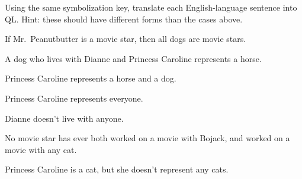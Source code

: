 \problempart
\label{pr.QLbojackother}
Using the same symbolization key, translate each English-language sentence into QL. Hint: these should have different forms than the cases above.
\begin{earg}
\item If Mr.\ Peanutbutter is a movie star, then all dogs are movie stars.
\item A dog who lives with Dianne and Princess Caroline represents a horse.
\item Princess Caroline represents a horse and a dog.
\item Princess Caroline represents everyone.
\item Dianne doesn't live with anyone.
\item No movie star has ever both worked on a movie with Bojack, and worked on a movie with any cat.
\item Princess Caroline is a cat, but she doesn't represent any cats.
\end{earg}



